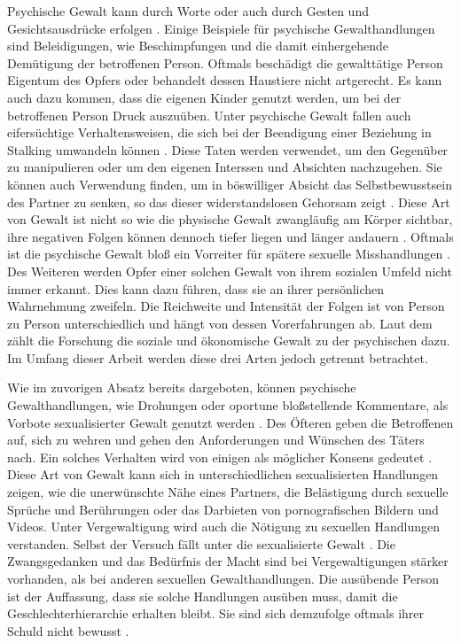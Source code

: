 Psychische Gewalt kann durch Worte oder auch durch Gesten und Gesichtsausdrücke erfolgen \parencite{Def_haus_Gewalt_2}. Einige Beispiele für psychische Gewalthandlungen sind Beleidigungen, wie Beschimpfungen und die damit einhergehende Demütigung der betroffenen Person. Oftmals beschädigt die gewalttätige Person Eigentum des Opfers oder behandelt dessen Haustiere nicht artgerecht. Es kann auch dazu kommen, dass die eigenen Kinder genutzt werden, um bei der betroffenen Person Druck auszuüben. Unter psychische Gewalt fallen auch  eifersüchtige Verhaltensweisen, die sich bei der Beendigung einer Beziehung in Stalking umwandeln können \parencite{Def_Form_Folge_Gewalt, Gewaltart, Def_haus_Gewalt_2}. Diese Taten werden verwendet, um den Gegenüber zu manipulieren oder um den eigenen Interssen und Absichten nachzugehen. Sie können auch Verwendung finden, um in böswilliger Absicht das Selbstbewusstsein des Partner zu senken, so das dieser widerstandslosen Gehorsam zeigt \parencite{Def_haus_Gewalt_2}. Diese Art von Gewalt ist nicht so wie die physische Gewalt zwangläufig am Körper sichtbar, ihre negativen Folgen können dennoch tiefer liegen und länger andauern \parencite{psych_Gewalt}. Oftmals ist die psychische Gewalt bloß ein Vorreiter für spätere sexuelle Misshandlungen \parencite{psych_Gewalt_2}. Des Weiteren werden Opfer einer solchen Gewalt von ihrem sozialen Umfeld nicht immer erkannt. Dies kann dazu führen, dass sie an ihrer persönlichen Wahrnehmung zweifeln. Die Reichweite und Intensität der Folgen ist von Person zu Person unterschiedlich und hängt von dessen Vorerfahrungen ab. Laut dem \textcite{Def_Form_Folge_Gewalt} zählt die Forschung die soziale und ökonomische Gewalt zu der psychischen dazu. Im Umfang dieser Arbeit werden diese drei Arten jedoch getrennt betrachtet. 

Wie im zuvorigen Absatz bereits dargeboten, können psychische Gewalthandlungen, wie Drohungen oder oportune bloßstellende Kommentare, als Vorbote sexualisierter Gewalt genutzt werden \parencite{Übergang_psy_zu_sex_Gewalt}. Des Öfteren geben die Betroffenen auf, sich zu wehren und gehen den Anforderungen und Wünschen des Täters nach. Ein solches Verhalten wird von einigen als möglicher Konsens gedeutet \parencite{Def_haus_Gewalt_2}. Diese Art von Gewalt kann sich in unterschiedlichen sexualisierten Handlungen zeigen, wie die unerwünschte Nähe eines Partners, die Belästigung durch sexuelle Sprüche und Berührungen oder das Darbieten von pornografischen Bildern und Videos. Unter Vergewaltigung wird auch die Nötigung zu sexuellen Handlungen verstanden. Selbst der Versuch fällt unter die sexualisierte Gewalt \parencite{Def_haus_Gewalt_2, Gewaltart, Def_Form_Folge_Gewalt}. Die Zwangsgedanken und das Bedürfnis der Macht sind bei Vergewaltigungen stärker vorhanden, als bei anderen sexuellen Gewalthandlungen. Die ausübende Person ist der Auffassung, dass sie solche Handlungen ausüben muss, damit die Geschlechterhierarchie erhalten bleibt. Sie sind sich demzufolge oftmals ihrer Schuld nicht bewusst \parencite{Def_haus_Gewalt_2}.

